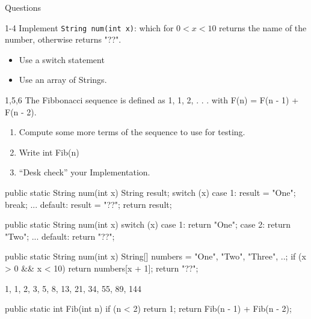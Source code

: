 \documentclass[week2]{csse2002}
\begin{document}
\begin{topic}{Questions}
\begin{subtopic}{1-4}
Implement \texttt{String num(int x)}: which for $0 < x < 10$ returns the name of the number, otherwise returns "??".
\begin{itemize}
	\item Use a switch statement
	\item Use an array of Strings.
\end{itemize}
\end{subtopic}

\begin{subtopic}{1,5,6}
The Fibbonacci sequence is defined as 1, 1, 2, . . . with F(n) = F(n - 1) + F(n - 2).
\begin{enumerate}
	\item Compute some more terms of the sequence to use for testing.
	\item Write int Fib(n)
	\item “Desk check” your Implementation.
\end{enumerate}
\end{subtopic}

\begin{subtopic}{2}
\begin{java}
public static String num(int x) {
	String result;
	switch (x) {
		case 1:
			result = "One";
			break;
		...
		default:
			result = "??";
	}
	return result;
}
\end{java}
\end{subtopic}

\begin{subtopic}{3}
\begin{java}
public static String num(int x) {
	switch (x) {
		case 1:
			return "One";
		case 2:
			return "Two";
		...
		default:
			return "??";
	}
}
\end{java}
\end{subtopic}

\begin{subtopic}{4}
\begin{java}
public static String num(int x) {
	String[] numbers = {"One", "Two", "Three", ..};
	if (x > 0 && x < 10) {
		return numbers[x + 1];
	}
	return "??";
}
\end{java}
\end{subtopic}

\begin{subtopic}{5}
1, 1, 2, 3, 5, 8, 13, 21, 34, 55, 89, 144
\end{subtopic}

\begin{subtopic}{6}
\begin{java}
public static int Fib(int n) {
	if (n < 2) {
		return 1;
	}
	return Fib(n - 1) + Fib(n - 2);
}
\end{java}
\end{subtopic}

\end{topic}
\end{document}
